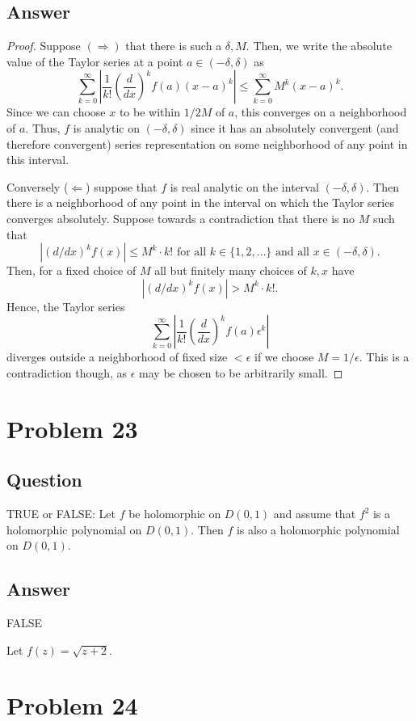 \documentclass[11pt]{article}
\begin{document}
\subsection{Answer}
\begin{proof}
Suppose  $(\Rightarrow)$ that there is such a $\delta, M$. Then, we write the absolute value of the Taylor series at a point $a \in (-\delta, \delta)$ as
\[ \sum_{k=0}^\infty  \left|\frac{1}{k!} \left( \frac{d}{dx}\right)^k f(a) (x - a)^k\right| \leq \sum_{k=0}^\infty M^k  (x - a)^k .\]
Since we can choose $x$ to be within $1/2M$ of $a$, this converges on a neighborhood of $a$. Thus, $f$ is analytic on $(-\delta,\delta)$ since it has an absolutely convergent (and therefore convergent) series representation on some neighborhood of any point in this interval.

Conversely ($\Leftarrow$) suppose that $f$ is real analytic on the interval $(-\delta, \delta)$. Then there is a neighborhood of any point in the interval on which the Taylor series converges absolutely. Suppose towards a contradiction that there is no $M$ such that
\[|(d/dx)^k f(x)|\leq M^k \cdot k!\mbox{ for all }k \in \{1,2, \dots\}\mbox{ and all }x \in (-\delta, \delta).\]
Then, for a fixed choice of $M$ all but finitely many choices of $k, x$ have
\[|(d/dx)^k f(x)|> M^k \cdot k!.\]
Hence, the Taylor series 
\[ \sum_{k=0}^\infty  \left|\frac{1}{k!} \left( \frac{d}{dx}\right)^k f(a) \epsilon^k\right|\]
diverges outside a neighborhood of fixed size $<\epsilon$ if we choose $M = 1/\epsilon$. This is a contradiction though, as $\epsilon$ may be chosen to be arbitrarily small.
\end{proof}


\section{Problem 23}
\subsection{Question}
TRUE or FALSE: Let $f$ be holomorphic on $D(0,1)$ and assume that $f^2$ is a holomorphic polynomial on $D(0,1)$. Then $f$ is also a holomorphic polynomial on $D(0,1)$.
\subsection{Answer}
FALSE

Let $f(z) = \sqrt{z+2}$. 

\section{Problem 24}
\end{document}

